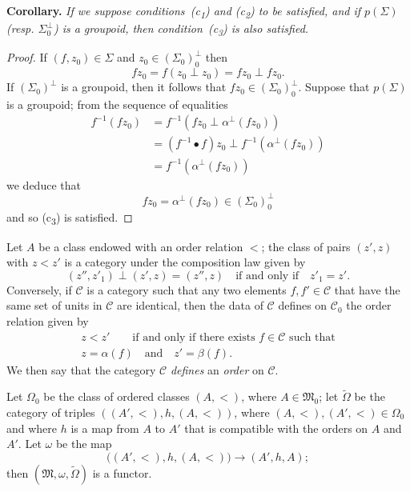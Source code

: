 \documentclass[fleqn]{article}
\newenvironment{itenv}[1]
  {\phantomsection\par\medskip\noindent\textbf{#1.}\itshape}
  {\par\medskip}
\newcommand{\oldpage}[1]{\marginpar{\footnotesize$\Big\vert$ \textit{p.~#1}}}
\newcommand{\CC}{\mathcal{C}}
\newcommand{\MM}{\mathfrak{M}}
\begin{document}
\begin{itenv}{Corollary}
  If we suppose conditions~(c\textsubscript{1}) and (c\textsubscript{2}) to be satisfied, and if $p(\Sigma)$ (resp. $\Sigma_0^\perp$) is a groupoid, then condition~(c\textsubscript{3}) is also satisfied.
\end{itenv}

\begin{proof}
  If $(f,z_0)\in\Sigma$ and $z_0\in(\Sigma_0)_0^\perp$ then
  \[
    fz_0
    = f(z_0\perp z_0)
    =fz_0\perp fz_0.
  \]
  If $(\Sigma_0)^\perp$ is a groupoid, then it follows that $fz_0\in(\Sigma_0)_0^\perp$.
  Suppose that $p(\Sigma)$ is a groupoid;
  from the sequence of equalities
  \[
    \begin{aligned}
      f^{-1}(fz_0)
      &= f^{-1}(fz_0\perp\alpha^\perp(fz_0))
    \\&= (f^{-1}\bullet f)z_0\perp f^{-1}(\alpha^\perp(fz_0))
    \\&= f^{-1}(\alpha^\perp(fz_0))
    \end{aligned}
  \]
  we deduce that
  \[
    fz_0
    = \alpha^\perp(fz_0)
    \in(\Sigma_0)_0^\perp
  \]
  and so (c\textsubscript{3}) is satisfied.
\end{proof}

Let $A$ be a class endowed with an order relation $<$;
the class of pairs $(z',z)$ with $z<z'$ is a category under the composition law given by
\[
  (z'',z'_1)\perp(z',z)
  =(z'',z)
  \quad\text{if and only if}\quad
  z'_1=z'.
\]
\oldpage{356}
Conversely, if $\CC$ is a category such that any two elements $f,f'\in\CC$ that have the same set of units in $\CC$ are identical, then the data of $\CC$ defines on $\CC_0$ the order relation given by
\[
  \begin{gathered}
    z<z'
    \qquad\text{if and only if there exists $f\in\CC$ such that}
  \\z=\alpha(f)
    \quad\text{and}\quad
    z'=\beta(f).
  \end{gathered}
\]
We then say that the category $\CC$ \emph{defines} an \emph{order} on $\CC$.

Let $\Omega_0$ be the class of ordered classes $(A,<)$, where $A\in\MM_0$;
let $\widetilde{\Omega}$ be the category of triples $((A',<),h,(A,<))$, where $(A,<),(A',<)\in\Omega_0$ and where $h$ is a map from $A$ to $A'$ that is compatible with the orders on $A$ and $A'$.
Let $\omega$ be the map
\[
  \big((A',<),h,(A,<)\big)
  \longrightarrow (A',h,A);
\]
then $(\MM,\omega,\widetilde{\Omega})$ is a functor.
\end{document}
